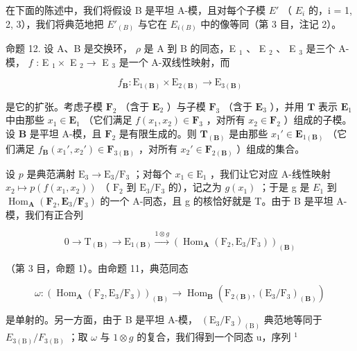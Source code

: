 在下面的陈述中，我们将假设 B 是平坦 A-模，且对每个子模 \(E'\) （ \(E_{i}\) 的，i = 1, 2, 3），我们将典范地把 \(E'_{(B)}\) 与它在 \(E_{i(B)}\) 中的像等同（第 3 目，注记 2）。

命题 12. 设 A、B 是交换环， \(\rho\) 是 A 到 B 的同态，E \(_{1}\) 、 E \(_{2}\) 、 E \(_{3}\) 是三个 A-模， \(f\) : E \(_{1} \times\) E \(_{2} \to\) E \(_{3}\) 是一个 A-双线性映射，而

\[
f _ {\mathbf {B}} \colon \mathrm{E} _ {1 (\mathbf {B})} \times \mathrm{E} _ {2 (\mathbf {B})} \rightarrow \mathrm{E} _ {3 (\mathbf {B})}
\]

是它的扩张。考虑子模 \(\mathbf{F}_2\) （含于 \(\mathbf{E}_2\) ）与子模 \(\mathbf{F}_3\) （含于 \(\mathbf{E}_3\) ），并用 \(\mathbf{T}\) 表示 \(\mathbf{E}_1\) 中由那些 \(x_1 \in \mathbf{E}_1\) （它们满足 \(f(x_1, x_2) \in \mathbf{F}_3\) ，对所有 \(x_2 \in \mathbf{F}_2\) ）组成的子模。设 \(\mathbf{B}\) 是平坦 A-模，且 \(\mathbf{F}_2\) 是有限生成的。则 \(\mathbf{T}_{(\mathbf{B})}\) 是由那些 \(x_1' \in \mathbf{E}_{1(\mathbf{B})}\) （它们满足 \(f_{\mathbf{B}}(x_1', x_2') \in \mathbf{F}_{3(\mathbf{B})}\) ，对所有 \(x_2' \in \mathbf{F}_{2(\mathbf{B})}\) ）组成的集合。

设 \(p\) 是典范满射 \(\mathrm{E}_3 \to \mathrm{E}_3 / \mathrm{F}_3\) ；对每个 \(x_1 \in \mathrm{E}_1\) ，我们让它对应 A-线性映射 \(x_2 \mapsto p(f(x_1, x_2))\) （ \(\mathrm{F}_2\) 到 \(\mathrm{E}_3 / \mathrm{F}_3\) 的），记之为 \(g(x_{1})\) ；于是 g 是 \(E_{1}\) 到 \(\operatorname{Hom}_{\mathbf{A}}(\mathbf{F}_{2}, \mathbf{E}_{3}/\mathbf{F}_{3})\) 的一个 A-同态，且 g 的核恰好就是 T。由于 B 是平坦 A-模，我们有正合列

\[
0 \longrightarrow \mathrm{T} _ {(\mathbf {B})} \longrightarrow \mathrm{E} _ {1 (\mathbf {B})} \stackrel {1 \otimes g} {\longrightarrow} \left(\operatorname{Hom} _ {\mathbf {A}} \left(\mathrm{F} _ {2}, \mathrm{E} _ {3} / \mathrm{F} _ {3}\right)\right) _ {(\mathbf {B})}
\]

（第 3 目，命题 1）。由命题 11，典范同态

\[
\omega : \left(\operatorname{Hom} _ {\mathbf {A}} (\mathrm{F} _ {2}, \mathrm{E} _ {3} / \mathrm{F} _ {3})\right) _ {(\mathbf {B})} \rightarrow \operatorname{Hom} _ {\mathbf {B}} (\mathrm{F} _ {2 (\mathbf {B})}, \left(\mathrm{E} _ {3} / \mathrm{F} _ {3}\right) _ {(\mathbf {B})})
\]

是单射的。另一方面，由于 B 是平坦 A-模， \((\mathrm{E}_{3}/\mathrm{F}_{3})_{(\mathrm{B})}\) 典范地等同于 \(E_{3(\mathrm{B})}/F_{3(\mathrm{B})}\) ；取 \(\omega\) 与 \(1 \otimes g\) 的复合，我们得到一个同态 u，序列 \(^{1}\)

